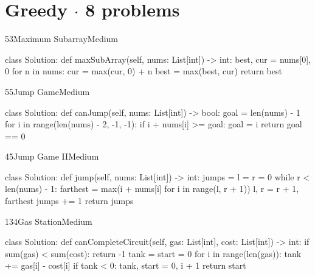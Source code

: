 \section{Greedy \texorpdfstring{{\normalsize\color{muted}$\cdot$ 8 problems}}{- 8 problems}}

\begin{problem}{53}{Maximum Subarray}{Medium}
\begin{code}
class Solution:
    def maxSubArray(self, nums: List[int]) -> int:
        best, cur = nums[0], 0
        for n in nums:
            cur = max(cur, 0) + n
            best = max(best, cur)
        return best
\end{code}
\end{problem}

\begin{problem}{55}{Jump Game}{Medium}
\begin{code}
class Solution:
    def canJump(self, nums: List[int]) -> bool:
        goal = len(nums) - 1
        for i in range(len(nums) - 2, -1, -1):
            if i + nums[i] >= goal:
                goal = i
        return goal == 0
\end{code}
\end{problem}

\begin{problem}{45}{Jump Game II}{Medium}
\begin{code}
class Solution:
    def jump(self, nums: List[int]) -> int:
        jumps = l = r = 0
        while r < len(nums) - 1:
            farthest = max(i + nums[i] for i in range(l, r + 1))
            l, r = r + 1, farthest
            jumps += 1
        return jumps
\end{code}
\end{problem}

\begin{problem}{134}{Gas Station}{Medium}
\begin{code}
class Solution:
    def canCompleteCircuit(self, gas: List[int], cost: List[int]) -> int:
        if sum(gas) < sum(cost):
            return -1
        tank = start = 0
        for i in range(len(gas)):
            tank += gas[i] - cost[i]
            if tank < 0:
                tank, start = 0, i + 1
        return start
\end{code}
\end{problem}

